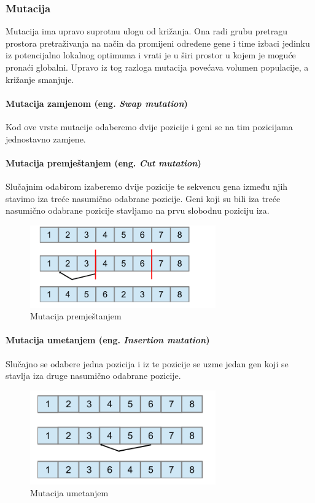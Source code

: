 \documentclass[times, utf8, zavrsni]{fer}
\begin{document}
	\subsubsection{Mutacija}
	
	Mutacija ima upravo suprotnu ulogu od križanja. Ona radi grubu pretragu prostora pretraživanja na način da promijeni određene gene i time izbaci jedinku iz potencijalno lokalnog optimuma i vrati je u širi prostor u kojem je moguće pronaći globalni. Upravo iz tog razloga mutacija povećava volumen populacije, a križanje smanjuje. 
	
	\paragraph{Mutacija zamjenom (eng. \emph{Swap mutation})}
	\label{SwapMutation}
	Kod ove vrste mutacije odaberemo dvije pozicije i geni se na tim pozicijama jednostavno zamjene.
	
	\paragraph{Mutacija premještanjem (eng. \emph{Cut mutation})}
	Slučajnim odabirom izaberemo dvije pozicije te sekvencu gena između njih stavimo iza treće nasumično odabrane pozicije. Geni koji su bili iza treće nasumično odabrane pozicije stavljamo na prvu slobodnu poziciju iza.
	
	\begin{figure}[!htb]
		\centering
		\includegraphics[width=8cm]{slike/cutMutation.png}
		\caption{Mutacija premještanjem}
		\label{fig:cut-mutation}
	\end{figure}
	
	\paragraph{Mutacija umetanjem (eng. \emph{Insertion mutation})}
	
	Slučajno se odabere jedna pozicija i iz te pozicije se uzme jedan gen koji se stavlja iza druge nasumično odabrane pozicije. 
	
	
	\begin{figure}[!htb]
		\centering
		\includegraphics[width=8cm]{slike/ISM.png}
		\caption{Mutacija umetanjem}
		\label{fig:insertion-mutation}
	\end{figure}
	
\end{document}
